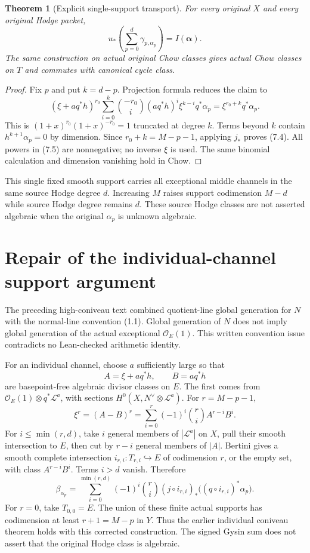 \documentclass[11pt]{article}
\newtheorem{theorem}{Theorem}[section]
\begin{document}
\begin{theorem}[Explicit single-support transport]
For every original $X$ and every original Hodge packet,
\[
 \boxed{u_*\left(\sum_{p=0}^{d}\gamma_{p,\alpha_p}\right)
          =I(\boldsymbol\alpha).}
 \tag{7.4}
\]
The same construction on actual original Chow classes gives actual
Chow classes on $T$ and commutes with canonical cycle class.
\end{theorem}
\begin{proof}
Fix $p$ and put $k=d-p$. Projection formula reduces the claim to
\[
 (\xi+a q^*h)^{r_0}
  \sum_{i=0}^{k}{-r_0\choose i}
       (a q^*h)^i\xi^{k-i}q^*\alpha_p
       =\xi^{r_0+k}q^*\alpha_p.
 \tag{7.5}
\]
This is $(1+x)^{r_0}(1+x)^{-r_0}=1$ truncated at degree $k$.
Terms beyond $k$ contain $h^{k+1}\alpha_p=0$ by dimension.
Since $r_0+k=M-p-1$, applying $j_*$ proves (7.4).
All powers in (7.5) are nonnegative; no inverse $\xi$ is used.
The same binomial calculation and dimension vanishing hold in Chow.
\end{proof}

This single fixed smooth support carries all exceptional middle
channels in the same source Hodge degree $d$.
Increasing $M$ raises support codimension $M-d$ while source
Hodge degree remains $d$. These source Hodge classes are not
asserted algebraic when the original $\alpha_p$ is unknown algebraic.

\section{Repair of the individual-channel support argument}
The preceding high-coniveau text combined quotient-line global
generation for $N$ with the normal-line convention (1.1).
Global generation of $N$ does not imply global generation of
the actual exceptional $\mathcal O_E(1)$.
This written convention issue contradicts no Lean-checked
arithmetic identity.

For an individual channel, choose $a$ sufficiently large so that
\[
 A=\xi+a q^*h,\qquad B=a q^*h
 \tag{8.1}
\]
are basepoint-free algebraic divisor classes on $E$.
The first comes from
$\mathcal O_E(1)\otimes q^*\mathcal L^a$, with sections
$H^0(X,N^\vee\otimes\mathcal L^a)$. For $r=M-p-1$,
\[
 \xi^r=(A-B)^r
     =\sum_{i=0}^{r}(-1)^i{r\choose i}A^{r-i}B^i.
 \tag{8.2}
\]
For $i\le\min(r,d)$, take $i$ general members of
$|\mathcal L^a|$ on $X$, pull their smooth intersection to $E$,
then cut by $r-i$ general members of $|A|$.
Bertini gives a smooth complete intersection
$i_{r,i}:T_{r,i}\hookrightarrow E$ of codimension $r$,
or the empty set, with class $A^{r-i}B^i$.
Terms $i>d$ vanish. Therefore
\[
 \boxed{\beta_{\alpha_p}
   =\sum_{i=0}^{\min(r,d)}(-1)^i{r\choose i}
     (j\circ i_{r,i})_*
       \bigl((q\circ i_{r,i})^*\alpha_p\bigr).}
 \tag{8.3}
\]
For $r=0$, take $T_{0,0}=E$. The union of these finite actual
supports has codimension at least $r+1=M-p$ in $Y$.
Thus the earlier individual coniveau theorem holds with this
corrected construction. The signed Gysin sum does not assert
that the original Hodge class is algebraic.
\end{document}
